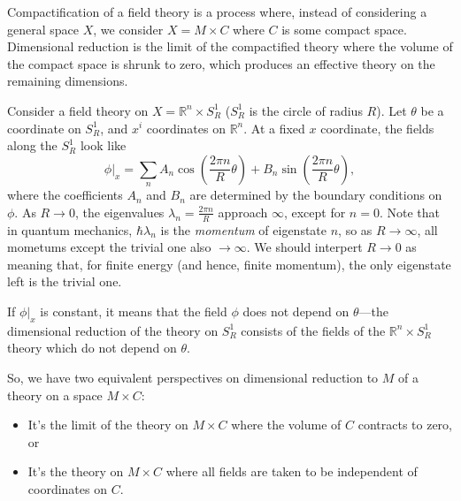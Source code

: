Compactification of a field theory is a process where, instead of
considering a general space $X$, we consider $X=M\times C$ where
$C$ is some compact space. Dimensional reduction is the limit of
the compactified theory where the volume of the compact space is shrunk
to zero, which produces an effective theory on the remaining dimensions.
\begin{example*}
 Consider a field theory on $X=\mathbb{R}^{n}\times S_{R}^{1}$
($S_{R}^{1}$ is the circle of radius $R$). Let $\theta$ be a coordinate
on $S_{R}^{1}$, and $x^{i}$ coordinates on $\mathbb{R}^{n}$. At
a fixed $x$ coordinate, the fields along the $S_{R}^{1}$ look like
\[
\phi|_{x}=\sum_{n}A_{n}\cos\left(\frac{2\pi n}{R}\theta\right)+B_{n}\sin\left(\frac{2\pi n}{R}\theta\right),
\]
where the coefficients $A_{n}$ and $B_{n}$ are determined by the
boundary conditions on $\phi$. As $R\rightarrow0$, the eigenvalues
$\lambda_{n}=\frac{2\pi n}{R}$ approach $\infty$, except for $n=0$.
Note that in quantum mechanics, $\hbar\lambda_{n}$ is the \emph{momentum}
of eigenstate $n$, so as $R\rightarrow\infty$, all mometums except
the trivial one also $\rightarrow\infty$. We should interpert $R\rightarrow0$
as meaning that, for finite energy (and hence, finite momentum), the
only eigenstate left is the trivial one.

If $\phi|_{x}$ is constant, it means that the field $\phi$ does
not depend on $\theta$---the dimensional reduction of the theory
on $S_{R}^{1}$ consists of the fields of the $\mathbb{R}^{n}\times S_{R}^{1}$
theory which do not depend on $\theta$.
\end{example*}
So, we have two equivalent perspectives on dimensional reduction to
$M$ of a theory on a space $M\times C$:
\begin{itemize}
\item It's the limit of the theory on $M\times C$ where the volume of $C$
contracts to zero, or
\item It's the theory on $M\times C$ where all fields are taken to be independent
of coordinates on $C$.
\end{itemize}


